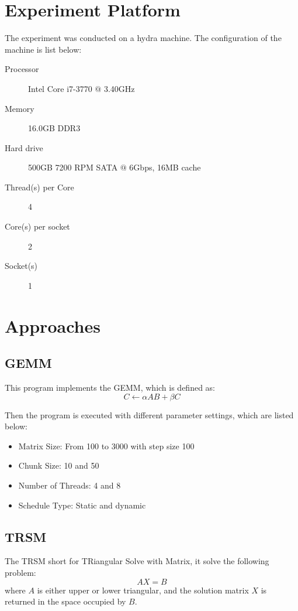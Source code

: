\documentclass{article}
\begin{document}
\newpage
\section{Experiment Platform}
The experiment was conducted on a hydra machine. The configuration of the machine is list below:
\begin{description}
\item[Processor] Intel Core i7-3770 $@$ 3.40GHz
\item[Memory] 16.0GB DDR3
\item[Hard drive] 500GB 7200 RPM SATA $@$ 6Gbps, 16MB cache
\item[Thread(s) per Core] 4
\item[Core(s) per socket] 2
\item[Socket(s)] 1
\end{description}

\newpage
\section{Approaches}
\subsection{GEMM}
This program implements the GEMM, which is defined as:
\begin{equation*}
C \leftarrow \alpha AB + \beta C
\end{equation*}

Then the program is executed with different parameter settings,  which are listed below:
\begin{itemize}
\item Matrix Size: From 100 to 3000 with step size 100
\item Chunk Size: 10 and 50
\item Number of Threads: 4 and 8
\item Schedule Type: Static and dynamic
\end{itemize}

\subsection{TRSM}
The TRSM short for TRiangular Solve with Matrix,  it solve the following problem:
\begin{equation*}
AX = B
\end{equation*}
where $A$ is either upper or lower triangular, and the solution matrix $X$ is returned in the space
occupied by $B$.
\end{document}
